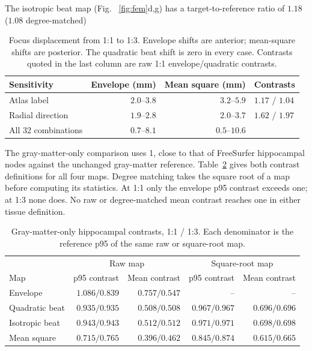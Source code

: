 \documentclass[11pt,a4paper]{article}
\providecommand{\DIFaddtex}[1]{{\protect\color{blue} \sf #1}} %
\providecommand{\DIFdeltex}[1]{{\protect\color{red} \scriptsize #1}} %
\providecommand{\DIFaddbegin}{} %
\providecommand{\DIFaddend}{} %
\providecommand{\DIFdelbegin}{} %
\providecommand{\DIFdelend}{} %
\providecommand{\DIFadd}[1]{\texorpdfstring{\DIFaddtex{#1}}{#1}} %
\providecommand{\DIFdel}[1]{\texorpdfstring{\DIFdeltex{#1}}{}} %
\begin{document}
\DIFdelbegin \DIFdel{The isotropic beat map (Fig. ~\ref{fig:fem}d,g) has a target-to-reference ratio of $1.18$
($1.08$ degree-matched) }\DIFdelend \DIFaddbegin \begin{table}[htbp]
\color{blue}\centering\small
\caption{\color{blue}Focus displacement from 1:1 to 1:3. Envelope shifts are anterior;
mean-square shifts are posterior. The quadratic beat shift is zero in every case.
Contrasts quoted in the last column are raw 1:1 envelope/quadratic contrasts.}
\label{tab:fem-sensitivities}
\begin{tabular}{@{}lrrl@{}}
\toprule
Sensitivity & Envelope (mm) & Mean square (mm) & Contrasts\\
\midrule
Atlas label & $2.0$--$3.8$ & $3.2$--$5.9$ & $1.17$ / $1.04$\\
Radial direction & $1.9$--$2.8$ & $2.0$--$3.7$ & $1.62$ / $1.97$\\
All 32 combinations & $0.7$--$8.1$ & $0.5$--$10.6$ & \\
\bottomrule
\end{tabular}
\end{table}


\DIFadd{The gray-matter-only comparison uses 1}\DIFaddend ,\DIFdelbegin \DIFdel{close to that of }\DIFdelend \DIFaddbegin \DIFadd{174 FreeSurfer hippocampal nodes
against the unchanged gray-matter reference. Table~\ref{tab:fem-gm-contrasts}
gives both contrast definitions for all four maps. Degree matching takes
the square root of a map before computing its statistics. At 1:1 only the
envelope p95 contrast exceeds one; at 1:3 none does. No raw or degree-matched
mean contrast reaches one in either tissue definition.
}

\begin{table}[htbp]
\color{blue}\centering\small
\caption{\color{blue}Gray-matter-only hippocampal contrasts, 1:1 / 1:3. Each denominator
is the reference p95 of the same raw or square-root map.}
\label{tab:fem-gm-contrasts}
\setlength{\tabcolsep}{4pt}
\begin{tabular}{@{}lrrrr@{}}
\toprule
& \multicolumn{2}{c}{Raw map} & \multicolumn{2}{c}{Square-root map}\\
Map & p95 contrast & Mean contrast & p95 contrast & Mean contrast\\
\midrule
Envelope & $1.086/0.839$ & $0.757/0.547$ & -- & --\\
Quadratic beat & $0.935/0.935$ & $0.508/0.508$ & $0.967/0.967$ & $0.696/0.696$\\
Isotropic beat & $0.943/0.943$ & $0.512/0.512$ & $0.971/0.971$ & $0.698/0.698$\\
Mean square & $0.715/0.765$ & $0.396/0.462$ & $0.845/0.874$ & $0.615/0.665$\\
\bottomrule
\end{tabular}
\end{table}
\end{document}

